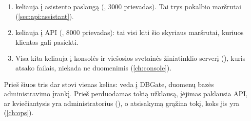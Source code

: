 \begin{enumerate}
  \item {} keliauja į asistento paslaugą (,
    3000 prievadas). Tai trys pokalbio maršrutai (\cref{sec:api:assistant}).
  \item {} keliauja į API (, 8000 prievadas): tai visi kiti šio
    skyriaus maršrutai, kuriuos klientas gali pasiekti.
  \item Visa kita keliauja į konsolės ir viešosios svetainės žiniatinklio serverį
    (), kuris atsako failais, niekada ne duomenimis (\cref{ch:console}).
\end{enumerate}

Prieš šiuos tris dar stovi vienas kelias:  veda į DBGate, duomenų bazės
administravimo įrankį. Prieš perduodamas tokią užklausą, įėjimas paklausia API, ar kviečiantysis
yra administratorius (), o atsisakymą grąžina tokį, koks
jis yra (\cref{ch:ops}).

